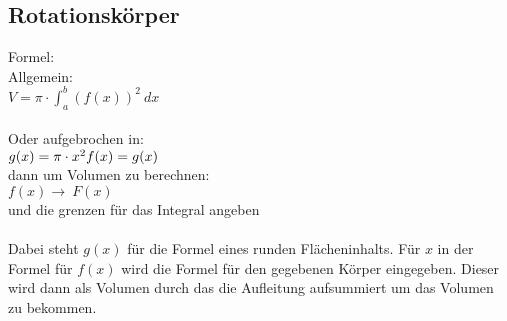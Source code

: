 \subsection{Rotationskörper}
Formel: \\
Allgemein: \\
$
V = \pi \cdot \int_a^b (f(x))^2\ dx
$ \\\\
Oder aufgebrochen in: \\
$
g(x) = \pi\cdot x^2 \\
f(x) = g(x)
$ \\
dann um Volumen zu berechnen: \\
$
f(x) \rightarrow\ F(x)
$ \\
und die grenzen für das Integral angeben \\\\
Dabei steht $g(x)$ für die Formel eines runden Flächeninhalts.
Für $x$ in der Formel für $f(x)$ wird die Formel für den gegebenen Körper eingegeben.
Dieser wird dann als Volumen durch das die Aufleitung aufsummiert um das Volumen zu bekommen.


